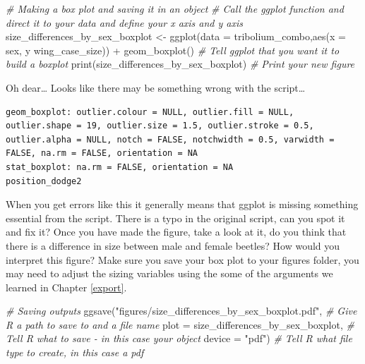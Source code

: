 \documentclass[
]{book}
\newenvironment{Shaded}{\begin{snugshade}}{\end{snugshade}}
\newcommand{\AttributeTok}[1]{\textcolor[rgb]{0.77,0.63,0.00}{#1}}
\newcommand{\CommentTok}[1]{\textcolor[rgb]{0.56,0.35,0.01}{\textit{#1}}}
\newcommand{\FunctionTok}[1]{\textcolor[rgb]{0.00,0.00,0.00}{#1}}
\newcommand{\NormalTok}[1]{#1}
\newcommand{\OtherTok}[1]{\textcolor[rgb]{0.56,0.35,0.01}{#1}}
\newcommand{\SpecialCharTok}[1]{\textcolor[rgb]{0.00,0.00,0.00}{#1}}
\newcommand{\StringTok}[1]{\textcolor[rgb]{0.31,0.60,0.02}{#1}}
\begin{document}
\begin{Shaded}
\begin{Highlighting}[]
\CommentTok{\# Making a box plot and saving it in an object}
\CommentTok{\# Call the ggplot function and direct it to your data and define your x axis and y axis}
\NormalTok{size\_differences\_by\_sex\_boxplot }\OtherTok{\textless{}{-}} \FunctionTok{ggplot}\NormalTok{(}\AttributeTok{data =}\NormalTok{ tribolium\_combo,}\FunctionTok{aes}\NormalTok{(}\AttributeTok{x =}\NormalTok{ sex, y wing\_case\_size)) }\SpecialCharTok{+} 
  \FunctionTok{geom\_boxplot}\NormalTok{() }\CommentTok{\# Tell ggplot that you want it to build a boxplot}
\FunctionTok{print}\NormalTok{(size\_differences\_by\_sex\_boxplot) }\CommentTok{\# Print your new figure}
\end{Highlighting}
\end{Shaded}

Oh dear\ldots{} Looks like there may be something wrong with the script\ldots{}

\begin{verbatim}
geom_boxplot: outlier.colour = NULL, outlier.fill = NULL, outlier.shape = 19, outlier.size = 1.5, outlier.stroke = 0.5, outlier.alpha = NULL, notch = FALSE, notchwidth = 0.5, varwidth = FALSE, na.rm = FALSE, orientation = NA
stat_boxplot: na.rm = FALSE, orientation = NA
position_dodge2 
\end{verbatim}

When you get errors like this it generally means that ggplot is missing something essential from the script. There is a typo in the original script, can you spot it and fix it? Once you have made the figure, take a look at it, do you think that there is a difference in size between male and female beetles? How would you interpret this figure? Make sure you save your box plot to your figures folder, you may need to adjust the sizing variables using the some of the arguments we learned in Chapter \ref{export}.

\begin{Shaded}
\begin{Highlighting}[]
\CommentTok{\# Saving outputs}
\FunctionTok{ggsave}\NormalTok{(}\StringTok{"figures/size\_differences\_by\_sex\_boxplot.pdf"}\NormalTok{, }\CommentTok{\# Give R a path to save to and a file name}
       \AttributeTok{plot =}\NormalTok{ size\_differences\_by\_sex\_boxplot, }\CommentTok{\# Tell R what to save {-} in this case your object}
       \AttributeTok{device =} \StringTok{"pdf"}\NormalTok{) }\CommentTok{\# Tell R what file type to create, in this case a pdf}
\end{Highlighting}
\end{Shaded}
\end{document}
